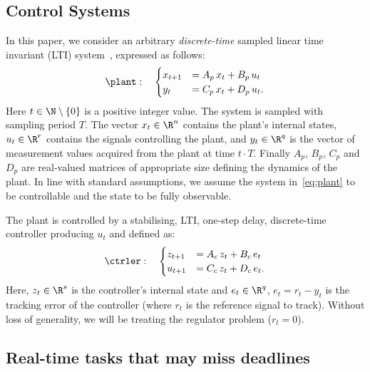 \subsection{Control Systems}
\label{ssec:systemmodel}
In this paper, we consider an arbitrary \emph{discrete-time} sampled linear time invariant (LTI) system~\cite{Astrom:1997}, expressed as follows:
%
\begin{equation}
    \label{eq:plant}
    \plant:\quad
    \begin{cases}
        x_{t+1} &= A_p\,x_t + B_p\,u_t \\
        y_{t} &= C_p\,x_t + D_p\,u_t.
    \end{cases}
\end{equation}
%
Here $t\in\N\setminus\left\{ 0 \right\}$ is a positive integer value.
The system is sampled with sampling period $T$.
The vector $x_t\in\R^n$ contains the plant's internal states, $u_t\in\R^r$ contains the signals controlling the plant, and $y_t\in\R^q$ is the vector of measurement values acquired from the plant at time $t\cdot T$. Finally $A_p$, $B_p$, $C_p$ and $D_p$ are real-valued matrices of appropriate size defining the dynamics of the plant.
In line with standard assumptions, we assume the system in~\eqref{eq:plant} to be controllable and the state to be fully observable.

The plant is controlled by a stabilising, LTI, one-step delay, discrete-time controller producing $u_t$ and defined as:
%
\begin{equation}
    \label{eq:controller}
    \ctrler:\quad
    \begin{cases}
        z_{t+1} &= A_c\,z_t + B_c\,e_t \\
        u_{t+1} &= C_c\,z_t + D_c\,e_t.
    \end{cases}
\end{equation}
%
Here, $z_t\in\R^s$ is the controller's internal state and $e_t\in\R^q$, $e_t= r_t - y_t$ is the tracking error of the controller (where $r_t$ is the reference signal to track).
Without loss of generality, we will be treating the regulator problem ($r_t = 0$).

\subsection{Real-time tasks that may miss deadlines}
\label{ssec:whalgebra}

